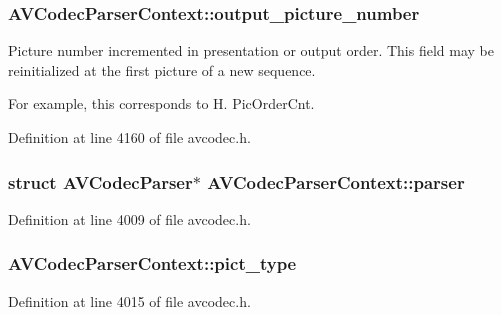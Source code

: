 \subsubsection[{\texorpdfstring{output\+\_\+picture\+\_\+number}{output_picture_number}}]{ A\+V\+Codec\+Parser\+Context\+::output\+\_\+picture\+\_\+number}\hypertarget{struct_a_v_codec_parser_context_a9d1e1c94451f877cbfd55e8cb3367f18}{}\label{struct_a_v_codec_parser_context_a9d1e1c94451f877cbfd55e8cb3367f18}
Picture number incremented in presentation or output order. This field may be reinitialized at the first picture of a new sequence.

For example, this corresponds to H. Pic\+Order\+Cnt. 

Definition at line 4160 of file avcodec.\+h.

\subsubsection[{\texorpdfstring{parser}{parser}}]{\setlength{\rightskip}{0pt plus 5cm}struct {\bf A\+V\+Codec\+Parser}$\ast$ A\+V\+Codec\+Parser\+Context\+::parser}\hypertarget{struct_a_v_codec_parser_context_a540286a805755b5b1f9d213f9f1d7109}{}\label{struct_a_v_codec_parser_context_a540286a805755b5b1f9d213f9f1d7109}


Definition at line 4009 of file avcodec.\+h.

\subsubsection[{\texorpdfstring{pict\+\_\+type}{pict_type}}]{ A\+V\+Codec\+Parser\+Context\+::pict\+\_\+type}\hypertarget{struct_a_v_codec_parser_context_a41702bcd99e8aeab875634fb44bfd741}{}\label{struct_a_v_codec_parser_context_a41702bcd99e8aeab875634fb44bfd741}


Definition at line 4015 of file avcodec.\+h.

